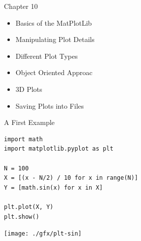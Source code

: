 


\begin{frame}[fragile]{Chapter 10}
%
\begin{itemize}
\item Basics of the MatPlotLib
\item Manipulating Plot Details
\item Different Plot Types
\item Object Oriented Approac
\item 3D Plots
\item Saving Plots into Files
\end{itemize}
%
\end{frame}


\begin{frame}[fragile]{A First Example}
%
\begin{codebox}[Example: A Simple Plot, width=.53\linewidth, nobeforeafter, equal height group = grpXmpSimplePlot]
\begin{verbatim}
import math
import matplotlib.pyplot as plt

N = 100
X = [(x - N/2) / 10 for x in range(N)]
Y = [math.sin(x) for x in X]

plt.plot(X, Y)
plt.show()
\end{verbatim}
\end{codebox}
%
\begin{tcolorbox}[title=Output: A Simple Plot, width=.45\linewidth, nobeforeafter, equal height group = grpXmpSimplePlot]
	\texttt{[image: ./gfx/plt-sin]}
\end{tcolorbox}
%
\end{frame}

